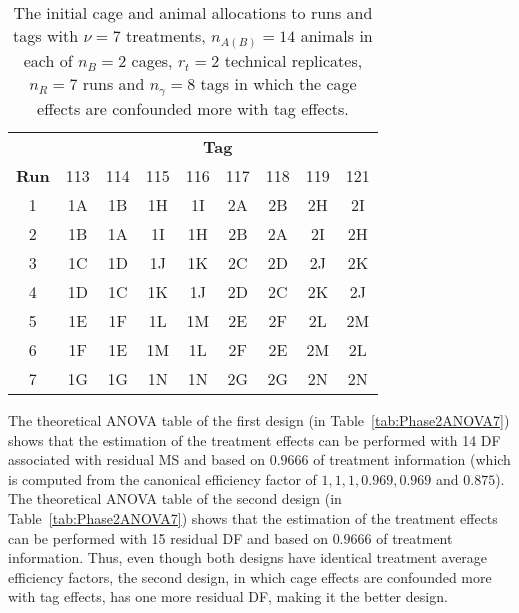 \begin{table}[h!]
\centering                                                   
\caption{The initial cage and animal allocations to runs and tags with $\nu = 7$ treatments, $n_{A(B)} = 14$ animals in each of $n_B = 2$ cages, $r_t = 2$ technical replicates, $n_R = 7$ runs and $n_\gamma = 8$ tags in which the cage effects are confounded more with tag effects.}                
\begin{tabular}[t]{c|cccccccc}                                      
 & \multicolumn{8}{c}{{\bf Tag}} \\                          
{\bf Run}  &  \textnormal{113} &  \textnormal{114} &  \textnormal{115} &  \textnormal{116} &  \textnormal{117} &  \textnormal{118} &  \textnormal{119} &  \textnormal{121}\\ \hline                                                      
\textnormal{1} & 1A & 1B & 1H & 1I & 2A & 2B & 2H & 2I \\
\textnormal{2} & 1B & 1A & 1I & 1H & 2B & 2A & 2I & 2H \\
\textnormal{3} & 1C & 1D & 1J & 1K & 2C & 2D & 2J & 2K \\
\textnormal{4} & 1D & 1C & 1K & 1J & 2D & 2C & 2K & 2J \\
\textnormal{5} & 1E & 1F & 1L & 1M & 2E & 2F & 2L & 2M \\
\textnormal{6} & 1F & 1E & 1M & 1L & 2F & 2E & 2M & 2L \\
\textnormal{7} & 1G & 1G & 1N & 1N & 2G & 2G & 2N & 2N \\
\end{tabular}                                                
\label{tab:cagDes8}                                       
\end{table}  

The theoretical ANOVA table of the first design (in Table~\ref{tab:Phase2ANOVA7})  shows that the estimation of the treatment effects can be performed with 14 DF associated with residual MS and based on $0.9666$ of treatment information (which is computed from the canonical efficiency factor of $1,1,1, 0.969, 0.969$ and $0.875$). The theoretical ANOVA table of the second design (in Table~\ref{tab:Phase2ANOVA7}) shows that the estimation of the treatment effects can be performed with 15 residual DF and based on $0.9666$ of treatment information. Thus, even though both designs have identical treatment average efficiency factors, the second design, in which cage effects are confounded more with tag effects, has one more residual DF, making it the better design. 

